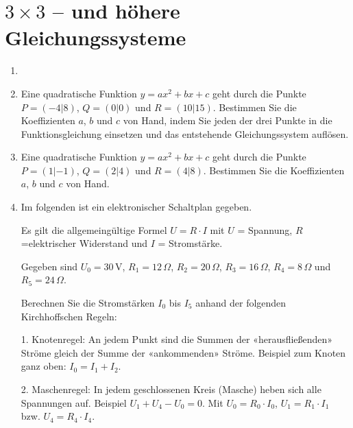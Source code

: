 \section{$3\times{}3$ -- und höhere Gleichungssysteme}

\begin{enumerate}[label=\alph*)]
\item
{}
\item
Eine quadratische Funktion $y=ax^2 + bx + c$ geht durch die Punkte
$P=(-4|8)$, $Q=(0|0)$ und $R=(10|15)$. Bestimmen Sie die Koeffizienten
$a$, $b$ und $c$ von Hand, indem Sie jeden der drei Punkte in die
Funktionsgleichung einsetzen und das entstehende Gleichungssystem
auf\/lösen.

\item
Eine quadratische Funktion $y=ax^2 + bx + c$ geht durch die Punkte
$P=(1|-1)$, $Q=(2|4)$ und $R=(4|8)$. Bestimmen Sie die Koeffizienten
$a$, $b$ und $c$ von Hand.

\item
Im folgenden ist ein elektronischer Schaltplan gegeben.


Es gilt die allgemeingültige Formel $U=R\cdot{}I$ mit $U$ = Spannung,
$R$=elektrischer Widerstand und $I$ = Stromstärke.

Gegeben sind
$U_0 = 30\,\text{V}$, 
$R_1 = 12\,\Omega$,
$R_2 = 20\,\Omega$,
$R_3 = 16\,\Omega$,
$R_4 = 8\,\Omega$ und
$R_5 = 24\,\Omega$.

Berechnen Sie die Stromstärken $I_0$ bis $I_5$ anhand der folgenden
Kirchhoffschen Regeln:

1. Knotenregel: An jedem Punkt sind die Summen der «herausfließenden»
Ströme gleich der Summe der «ankommenden» Ströme. Beispiel zum Knoten ganz oben: $I_0 = I_1
+ I_2$.

2. Maschenregel: In jedem geschlossenen Kreis (Masche) heben sich alle
Spannungen auf. Beispiel $U_1 + U_4 - U_0 = 0$. Mit
$U_0 = R_0 \cdot{} I_0$,
$U_1 = R_1 \cdot{} I_1$ bzw. 
$U_4 = R_4 \cdot{} I_4$.

\end{enumerate}
